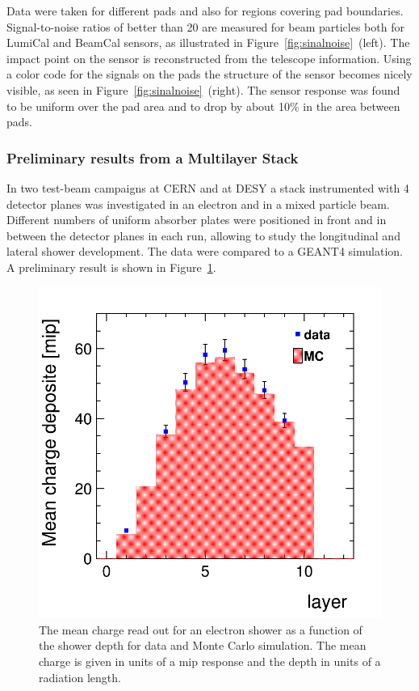Data were taken for different pads and also for regions covering pad boundaries.
Signal-to-noise ratios
of better than 20 are measured for beam particles both for LumiCal and BeamCal sensors,
as illustrated in Figure~\ref{fig:sinalnoise}~(left).
The impact point on the sensor is reconstructed from the telescope information.
Using a color code for the signals on the pads
the structure of the sensor becomes nicely visible, as seen in Figure~\ref{fig:sinalnoise}~(right).
The sensor response was found to be uniform over the pad area and to drop by about 10\% in the
area between pads.

\subsubsection{Preliminary results from a Multilayer Stack}

In two test-beam campaigns at CERN and at DESY a stack instrumented with 4 detector planes was investigated in
an electron and in a mixed particle beam.
Different numbers of uniform absorber plates were positioned in front and in between the detector planes in each
run, allowing to study the longitudinal and lateral shower development.
The data were compared to a GEANT4 simulation. A preliminary result is shown in Figure~\ref{fig:shower_development}.
\begin{figure}[hbp]
\centering
\includegraphics[width=0.6\columnwidth]{Calorimeter/FCAL/figs/long_shower}
\caption{The mean charge read out for an electron shower as a function of the shower depth for data and Monte Carlo
simulation.
The mean charge is given in units of a mip response and the depth in units of a radiation length.  }
\label{fig:shower_development}
\end{figure}


